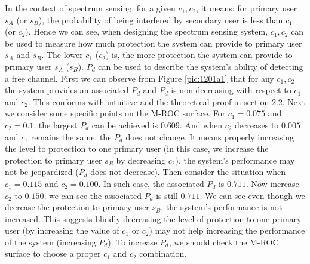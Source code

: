In the context of spectrum sensing, for a given $c_1, c_2$, it means: for primary user $s_A$ (or $s_B$), the probability of being interfered by secondary user is less than $c_1$ (or $c_2$). Hence we can see, when designing the spectrum sensing system,  $c_1, c_2$ can be used to measure how much protection the system can provide to primary user $s_A$ and $s_B$.  The lower $c_1$ ($c_2$) is, the more protection the system can provide to primary user $s_A$ ($s_B$). $P_d$ can be used to describe the system's ability of detecting a free channel.   First we can observe from Figure \ref{pic:1201a1} that for any $c_1, c_2$ the system provides an associated $P_d$ and $P_d$ is non-decreasing with respect to $c_1$ and $c_2$. This conforms with intuitive and the theoretical proof in section 2.2.     
Next we consider some specific points on the M-ROC surface. For $c_1 = 0.075$ and $c_2  = 0.1$, the largest $P_d$ can be achieved is $0.609$. And when $c_2$ decreases to $0.005$ and  $c_1$ remains the same, the $P_d$ does not change.   
 It means properly increasing the level to protection to one primary user (in this case, we increase the protection to primary user $s_B$ by decreasing $c_2$), the system's performance may not be jeopardized ($P_d$ does not decrease).  
Then consider the situation when $c_1 = 0.115$ and $c_2 = 0.100$. In such case, the associated $P_d$ is $0.711$. Now increase $c_2$ to $0.150$, we can see the associated $P_d$ is still $0.711$. We can see even though we decrease the protection to primary user $s_B$, the system's performance is not increased.  
This suggests blindly decreasing the level of protection to one primary user (by increasing the value of $c_1$ or $c_2$) may not help increasing the performance of the system (increasing $P_d$). To increase $P_d$, we should check the M-ROC surface to choose a proper $c_1$ and $c_2$ combination.

